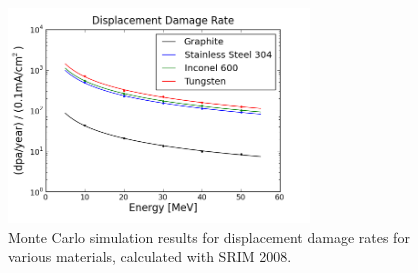 \documentclass[final,3p,times,twocolumn]{elsarticle} %
\begin{document}
\begin{figure}[htbp]
\begin{center}
\includegraphics[width=80mm]{Figures/SRIMDPA.png}
\caption{Monte Carlo simulation results for displacement damage rates for various materials, calculated with SRIM 2008.} 
\label{fig:SRIMDPA}
\end{center}
\end{figure}
% 
%
%
%
%
\end{document}
